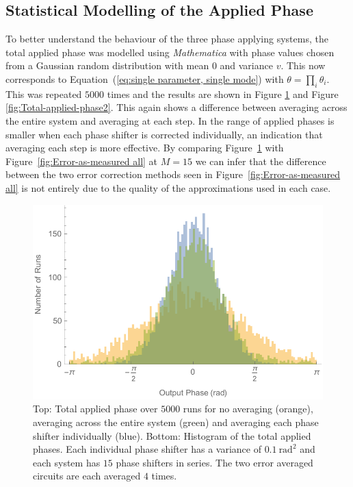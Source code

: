 \documentclass[aps,pra,twocolumn,superscriptaddress,numerical,floatfix]{revtex4-1}
\begin{document}


\subsection{Statistical Modelling of the Applied Phase\label{Statistical Modelling of the Applied Phase}}

To better understand the behaviour of the three phase applying systems, the total applied phase was modelled using \textit{Mathematica} with phase values chosen from a Gaussian random distribution with mean $0$ and variance $v$. This now corresponds to Equation~(\ref{eq:single parameter, single mode}) with $\theta=\prod_{i}\theta_{i}$. This was repeated $5000$ times and the results are shown in Figure \ref{fig:Total-applied-phase1} and Figure \ref{fig:Total-applied-phase2}. This again shows a difference between averaging across the entire system and averaging at each step. In the range of applied phases is smaller when each phase shifter is corrected individually, an indication that averaging each step is more effective. By comparing Figure~\ref{fig:Total-applied-phase1} with Figure~\ref{fig:Error-as-measured all} at $M=15$ we can infer that the difference between the two error correction methods seen in Figure~\ref{fig:Error-as-measured all} is not entirely due to the quality of the approximations used in each case.
%
\begin{figure}
\centerline{\includegraphics[width=\columnwidth]{totphase1.pdf}}
\caption{Top: Total applied phase over $5000$ runs for no averaging (orange), averaging across the entire system (green) and averaging each phase shifter individually (blue). Bottom: Histogram of the total applied phases. Each individual phase shifter has a variance of $0.1\ \textrm{rad}^{2}$ and each system has $15$ phase shifters in series. The two error averaged circuits are each averaged $4$ times. \label{fig:Total-applied-phase1}}
\end{figure}
\end{document}
